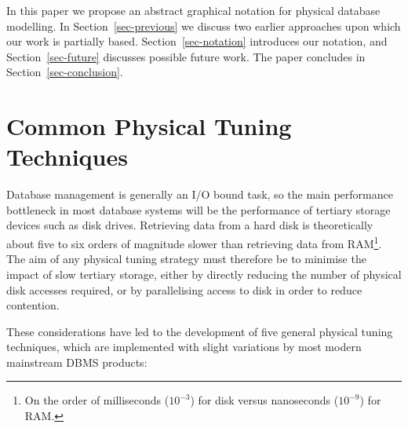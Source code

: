 \documentclass{CRPITStyle}
\begin{document}
In this paper we propose an abstract graphical notation for physical
database modelling. In Section~\ref{sec-previous} we discuss two earlier
approaches upon which our work is partially based.
Section~\ref{sec-notation} introduces our notation, and
Section~\ref{sec-future} discusses possible future work. The paper
concludes in Section~\ref{sec-conclusion}.


\section{Common Physical Tuning Techniques}
\label{sec-techniques}

Database management is generally an I/O bound task, so the main
performance bottleneck in most database systems will be the performance
of tertiary storage devices such as disk drives. Retrieving data from a
hard disk is theoretically about five to six orders of magnitude slower
than retrieving data from RAM\footnote{On the order of milliseconds
(\(10^{-3}\)) for disk versus nanoseconds (\(10^{-9}\)) for RAM.}. The
aim of any physical tuning strategy must therefore be to minimise the
impact of slow tertiary storage, either by directly reducing the number
of physical disk accesses required, or by parallelising access to disk
in order to reduce contention.

These considerations have led to the development of five general
physical tuning techniques, which are implemented with slight variations
by most modern mainstream DBMS products:
\end{document}
